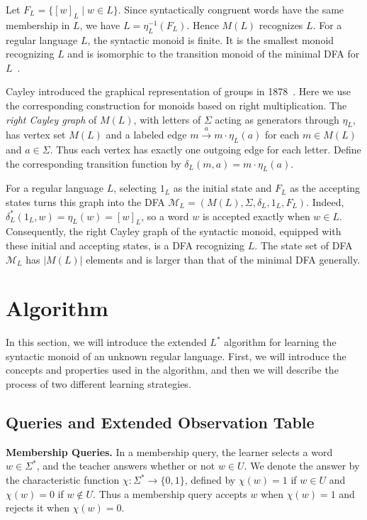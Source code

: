 \documentclass{ieice-tecrep}
\begin{document}
Let \(F_L=\{[w]_L\mid w\in L\}\). Since syntactically congruent
words have the same membership in \(L\), we have \(L=\eta_L^{-1}(F_L)\). Hence \(M(L)\) recognizes \(L\).
For a regular language \(L\), the syntactic monoid is finite. It is the
smallest monoid recognizing \(L\) and is isomorphic to the
transition monoid of the minimal DFA for \(L\)~\cite{holzer2004deterministic}.

Cayley introduced the graphical representation of groups in
1878~\cite{cayley1878graphical}. Here we use the corresponding
construction for monoids based on right multiplication.
The \emph{right Cayley graph} of \(M(L)\), with letters of \(\Sigma\)
acting as generators through \(\eta_L\), has vertex set \(M(L)\)
and a labeled edge
\(m\xrightarrow{a}m\cdot\eta_L(a)\) for each \(m\in M(L)\)
and \(a\in\Sigma\). Thus each vertex has exactly one outgoing
edge for each letter. Define the corresponding transition function
by \(\delta_L(m,a)=m\cdot\eta_L(a)\).

For a regular language \(L\), selecting \(1_L\) as the initial state and
\(F_L\) as the accepting states turns this graph into the DFA
\(\mathcal{M}_L=(M(L),\Sigma,\delta_L,1_L,F_L)\).
Indeed, \(\delta_L^*(1_L,w)=\eta_L(w)=[w]_L\), so a word
\(w\) is accepted exactly when \(w\in L\).
Consequently, the right Cayley graph of the syntactic monoid,
equipped with these initial and accepting states, is a DFA
recognizing \(L\). The state set of DFA \(\mathcal{M}_L\) has \(|M(L)|\) elements and is larger than that of the minimal DFA generally.

\section{Algorithm}\label{algorithm}

In this section, we will introduce the extended \(L^*\) algorithm for learning the syntactic monoid of an unknown regular language.
First, we will introduce the concepts and properties used in the algorithm, and then we will describe the process of two different learning strategies.

\subsection{Queries and Extended Observation Table}\label{algorithm-concepts}
\textbf{Membership Queries.} In a membership query, the learner selects a word \(w \in \Sigma^*\), and the teacher answers whether or not \(w \in U\).
We denote the answer by the characteristic function
\(\chi:\Sigma^*\to\{0,1\}\), defined by \(\chi(w)= 1\) if \(w\in U\) and \(\chi(w)=0\) if \(w\notin U\).
Thus a membership query accepts \(w\) when \(\chi(w)=1\) and
rejects it when \(\chi(w)=0\).
\end{document}
